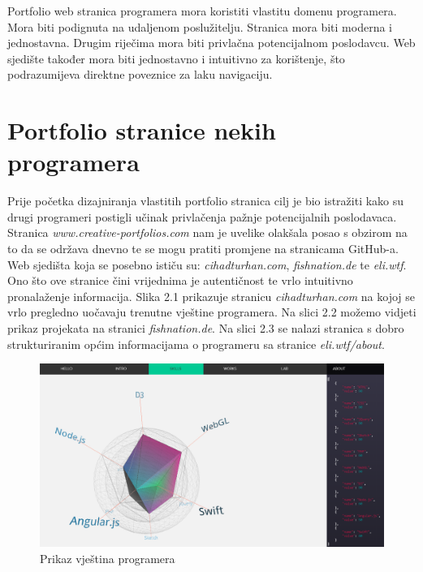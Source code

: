 \documentclass[times, utf8, zavrsni, numeric]{fer}
\begin{document}
Portfolio web stranica programera mora koristiti vlastitu domenu programera.
Mora biti podignuta na udaljenom poslužitelju.
Stranica mora biti moderna i jednostavna.
Drugim riječima mora biti privlačna potencijalnom poslodavcu.
Web sjedište također mora biti jednostavno i intuitivno za korištenje, što podrazumijeva direktne poveznice za laku navigaciju.

\section{Portfolio stranice nekih programera}
\qquad Prije početka dizajniranja vlastitih portfolio stranica cilj je bio istražiti kako su drugi programeri postigli učinak privlačenja pažnje potencijalnih poslodavaca.
Stranica \textit{www.creative-portfolios.com} nam je uvelike olakšala posao s obzirom na to da se održava dnevno te se mogu pratiti promjene na stranicama GitHub-a.
Web sjedišta koja se posebno ističu su: \textit{cihadturhan.com}, \textit{fishnation.de} te \textit{eli.wtf}.
Ono što ove stranice čini vrijednima je autentičnost te vrlo intuitivno pronalaženje informacija.
Slika 2.1 prikazuje stranicu \textit{cihadturhan.com} na kojoj se vrlo pregledno uočavaju trenutne vještine programera.
Na slici 2.2 možemo vidjeti prikaz projekata na stranici \textit{fishnation.de}.
Na slici 2.3 se nalazi stranica s dobro strukturiranim općim informacijama o programeru sa stranice \textit{eli.wtf/about}.

\begin{figure}[htb]
				\includegraphics[width=14.6cm]{images/skills.png}
				\caption{Prikaz vještina programera}
				\label{fig:skills}
\end{figure}
\end{document}
